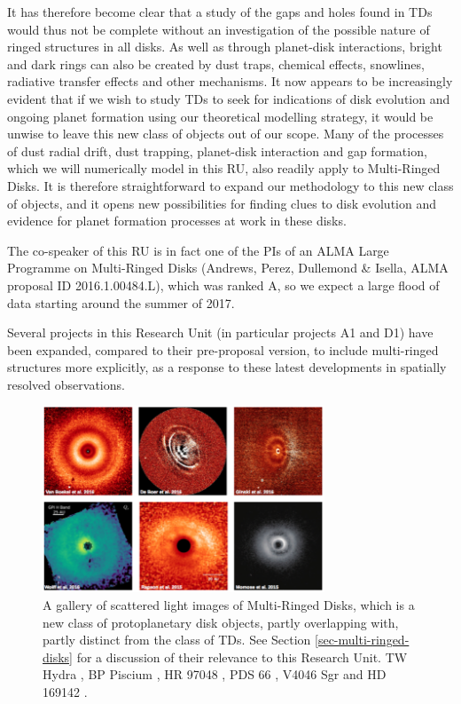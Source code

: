 \documentclass[10pt,fleqn,twoside]{article}
\begin{document}
It has therefore become clear that a study of the gaps and holes found in
TDs would thus not be complete without an investigation of the
possible nature of ringed structures in all disks. As well as through planet-disk
interactions, bright and dark rings can also be created by dust traps,
chemical effects, snowlines, radiative transfer effects and other
mechanisms. It now appears to be increasingly evident that if we wish to
study TDs to seek for indications of disk evolution and ongoing planet
formation using our theoretical modelling strategy, it would be unwise
to leave this new class of objects out of our scope. Many of the processes of
dust radial drift, dust trapping, planet-disk interaction and gap formation,
which we will numerically model in this RU, 
also readily apply to Multi-Ringed Disks. It is therefore straightforward to expand
our methodology to this new class of objects, and it opens new
possibilities for finding clues to disk evolution and evidence for planet
formation processes at work in these disks.

The co-speaker of this RU is in fact one of the PIs of an ALMA Large Programme on
Multi-Ringed Disks (Andrews, Perez, Dullemond \& Isella, ALMA proposal ID
2016.1.00484.L), which was ranked A, so we expect a large flood of data
starting around the summer of 2017. 

Several projects in this Research Unit (in particular projects A1 and D1)
have been expanded, compared to their pre-proposal version, to include
multi-ringed structures more explicitly, as a response to these latest
developments in spatially resolved observations.

\begin{figure}
\centerline{\includegraphics[width=0.75\textwidth]{figures/Ringed_Scat.png}}
\caption{\label{fig-ringed-scat} A gallery of scattered light images of
  Multi-Ringed Disks, which is a new class of protoplanetary disk objects,
  partly overlapping with, partly distinct from the class of TDs. See
  Section \ref{sec-multi-ringed-disks} for a discussion of their relevance
  to this Research Unit. 
  TW Hydra \citep{2016arXiv161008939V}, BP Piscium
  \citep{2017MNRAS.466L...7D}, HR 97048 \citep{2016A&A...595A.112G}, PDS 66
  \citep{2016ApJ...818L..15W}, V4046 Sgr \citep{2015ApJ...803L..10R} and HD
  169142 \citep{2015PASJ...67...83M}.}
\end{figure}
\end{document}
